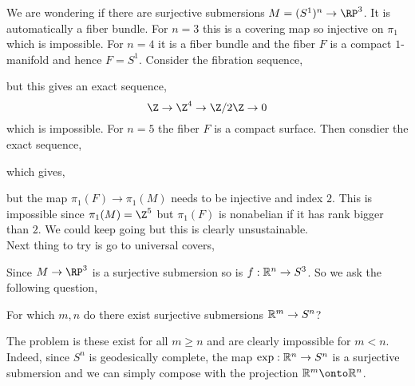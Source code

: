 \documentclass[12pt]{article}
\begin{document}
We are wondering if there are surjective submersions $M = (S^1)^n \to \RP^3$. It is automatically a fiber bundle. For $n = 3$ this is a covering map so injective on $\pi_1$ which is impossible. For $n = 4$ it is a fiber bundle and the fiber $F$ is a compact $1$-manifold and hence $F = S^1$. Consider the fibration sequence,
\begin{center}
\end{center}
but this gives an exact sequence,
\[ \Z \to \Z^4 \to \Z / 2 \Z \to 0 \]
which is impossible. For $n = 5$ the fiber $F$ is a compact surface. Then consdier the exact sequence,
\begin{center}
\end{center}
which gives,
\begin{center}
\end{center}
but the map $\pi_1(F) \to \pi_1(M)$ needs to be injective and index $2$. This is impossible since $\pi_1(M) = \Z^5$ but $\pi_1(F)$ is nonabelian if it has rank bigger than $2$. We could keep going but this is clearly unsustainable. 
\bigskip\\
Next thing to try is go to universal covers,
\begin{center}
\end{center}
Since $M \to \RP^3$ is a surjective submersion so is $f : \mathbb{R}^n \to S^3$. So we ask the following question,
\begin{rmk}
For which $m,n$ do there exist surjective submersions $\mathbb{R}^m \to S^n$?
\end{rmk}
The problem is these exist for all $m \ge n$ and are clearly impossible for $m < n$. Indeed, since $S^n$ is geodesically complete, the map $\exp : \mathbb{R}^n \to S^n$ is a surjective submersion and we can simply compose with the projection $\R^m \onto \R^n$.
\end{document}
